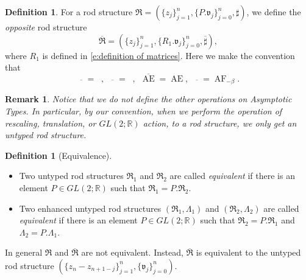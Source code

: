 \documentclass[a4paper,11pt]{amsart}
\newtheorem{remark}[theorem]{Remark}
\theoremstyle{definition}
\newtheorem{definition}[theorem]{Definition}
\numberwithin{equation}{section}
\newcommand{\R}{\mathbb{R}}
\newcommand{\mv} {\mathfrak v}
\newcommand{\mR} {\mathfrak R}
\DeclareMathOperator{\Ae}{AE}
\DeclareMathOperator{\ALFp}{ALF^+}
\DeclareMathOperator{\ALFm}{ALF^{--}}
\DeclareMathOperator{\AF}{AF}
\DeclareMathOperator{\AFa}{AF_\beta}
\begin{document}
\begin{definition}
    For a rod structure $\mathfrak R=(\{z_j\}_{j=1}^n, \{P. \mv_j\}_{j=0}^n, \sharp)$, 
  we define the \emph{opposite} rod structure
       \[
   \overline{\mathfrak{R}} = \left(\{z_j\}_{j=1}^n, \{R_1.\mathfrak{v}_{j}\}_{j=0}^n, \overline\sharp \right), 
    \]
    where $R_1$ is defined in \eqref{e:definition of matrices}.
    Here we make the convention that 
    \begin{equation}
        \overline{\ALFp}=\ALFm, \ \ \overline{\ALFm}=\ALFp, \ \ \overline{\Ae}=\Ae,  \ \ \overline{\AFa}=\AF_{-\beta}.
    \end{equation}

\end{definition}
\begin{remark}Notice that we do not define the other operations on Asymptotic Types. In particular, by our convention, when we perform the operation of rescaling, translation, or $GL(2;\R)$ action, to a rod structure, we only get an untyped rod structure. 
\end{remark}


\begin{definition}[Equivalence]

\

\begin{itemize}
	\item Two untyped rod structures $\mathfrak R_1$ and $\mathfrak R_2$ are called \emph{equivalent} if 
    there is an element $P\in GL(2;\mathbb{R})$ such that $\mathfrak{R}_1=P.\mathfrak{R}_2$.
    \item Two enhanced untyped rod structures $(\mathfrak R_1, \Lambda_1)$ and $(\mathfrak R_2, \Lambda_2)$ are called  \emph{equivalent} if there is an element $P\in GL(2;\mathbb{R})$ such that $\mathfrak{R}_2=P.\mathfrak{R}_1$ and $\Lambda_2=P.\Lambda_1$. 
\end{itemize}
	\end{definition}
In general $\mR$ and $\overline{\mR}$ are not equivalent. Instead, $\overline{\mR}$ is equivalent to the untyped rod structure $(\{z_n-z_{n+1-j}\}_{j=1}^n, \{\mv_j\}_{j=0}^n)$.


\
\end{document}
